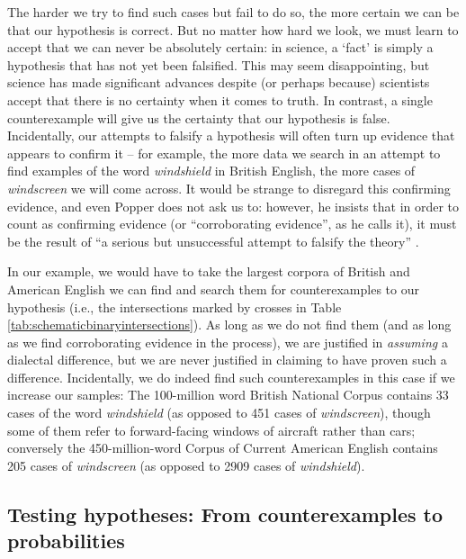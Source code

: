 The harder we try to find such cases but fail to do so, the more certain we can be that our hypothesis is correct. But no matter how hard we look, we must learn to accept that we can never be absolutely certain: in science, a `fact' is simply a hypothesis that has not yet been falsified. This may seem disappointing, but science has made significant advances despite (or perhaps because) scientists accept that there is no certainty when it comes to truth. In contrast, a single counterexample will give us the certainty that our hypothesis is false. Incidentally, our attempts to falsify a hypothesis will often turn up evidence that appears to confirm  it -- for example, the more data we search in an attempt to find examples of the word \textit{windshield} in British English, the more cases of \textit{windscreen} we will come across. It would be strange to disregard this confirming evidence, and even Popper does not ask us to: however, he insists that in order to count as confirming evidence (or ``corroborating evidence'', as he calls it), it must be the result of ``a serious but unsuccessful attempt to falsify the theory'' \citep[36]{popper_conjectures_1963}.

In our example, we would have to take the largest corpora of British and American English we can find and search them for counterexamples to our hypothesis (i.e., the intersections marked by crosses in Table \ref{tab:schematicbinaryintersections}). As long as we do not find them (and as long as we find corroborating evidence in the process), we are justified in \textit{assuming} a dialectal difference, but we are never justified in claiming to have proven such a difference. Incidentally, we do indeed find such counterexamples in this case if we increase our samples: The 100-million word British National Corpus contains 33 cases of the word \textit{windshield} (as opposed to 451 cases of \textit{windscreen}), though some of them refer to forward-facing windows of aircraft rather than cars; conversely the 450-million-word Corpus of Current American English contains 205 cases of \textit{windscreen} (as opposed to 2909 cases of \textit{windshield}).


\subsection{Testing hypotheses: From counterexamples to probabilities}
\label{sec:testinghypotheses}

